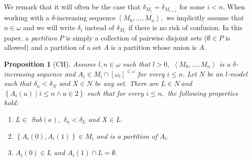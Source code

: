 \documentclass{article}%
\newtheorem{proposition}[theorem]{Proposition}
\begin{document}
We remark that it will often be the case that $\delta_{M_{i}}=\delta_{M_{i+1}%
}$ for some $i<n.$ When working with a $\delta$-increasing
sequence$\ \left\langle M_{0},...,M_{n}\right\rangle ,$ we implicitly assume
that $n\in\omega$ and we will write $\delta_{i}$ instead of $\delta_{M_{i}}$
if there is no risk of confusion. In this paper, a\emph{ partition} $P$ is
simply a collection of pairwise disjoint sets ($\emptyset\in P$ is allowed)
and a partition of a set $A$ is a partition whose union is $A.$

\begin{proposition}
[\textsf{CH}]Assume $l,n\in\omega$ such that $l>0,$ $\left\langle
M_{0},...,M_{n}\right\rangle $ is a $\delta$-increasing sequence and $A_{i}\in
M_{i}\cap\left[  \omega_{l}\right]  ^{\leq\omega}$ for every $i\leq n.$ Let
$N$ be an $l$-model such that $\delta_{n}<\delta_{N}$ and $X\in N$ be any set.
There are $L\in N\ $and $\left\{  A_{i}\left(  u\right)  \mid i\leq n\wedge
u\in2\right\}  $ such that for every $i\leq n,$ the following properties
hold:\label{Partir sucesion}

\begin{enumerate}
\item $L\in$ \textsf{Sub}$\left(  \kappa\right)  ,$ $\delta_{n}<\delta_{L}$
and $X\in L.$

\item $\left\{  A_{i}\left(  0\right)  ,A_{i}\left(  1\right)  \right\}  \in
M_{i}$ and is a partition of $A_{i}.$

\item $A_{i}\left(  0\right)  \in L$ and $A_{i}\left(  1\right)  \cap
L=\emptyset.$
\end{enumerate}
\end{proposition}
\end{document}

